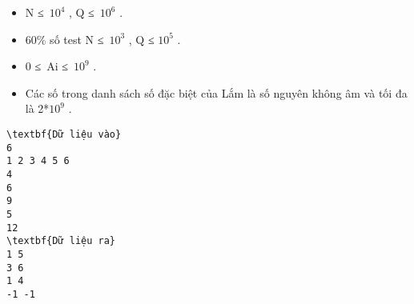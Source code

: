 \begin{itemize}
	\item N ≤ $10^{4}$ , Q ≤ $10^{6}$ .
	\item 60\% số test N ≤ $10^{3}$ , Q ≤ $10^{5}$ .
	\item 0 ≤ Ai ≤ $10^{9}$ .
	\item Các số trong danh sách số đặc biệt của Lắm là số nguyên không âm và tối đa là 2*$10^{9}$ .
\end{itemize}
\begin{verbatim}
\textbf{Dữ liệu vào}
6
1 2 3 4 5 6
4
6
9
5
12
\textbf{Dữ liệu ra}
1 5
3 6
1 4
-1 -1
\end{verbatim}